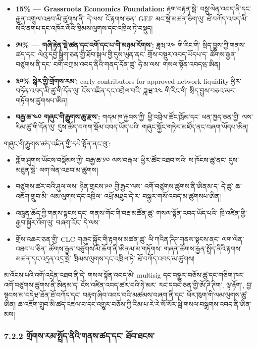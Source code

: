 \documentclass[11pt]{article}
\begin{document}
\begin{itemize}[leftmargin=*]
\item \textbf{15\% --- Grassroots Economics Foundation:} རྟག་བརྟན་སྦེ་ བསྡུ་ལེན་འབད་ནི་དང་ རྒྱུན་འགྲུལ་འཐབ་མི་ཚུགས་ནི་ དེ་ལས་ ངོ་རྟགས་ཅན་ GEF མང་སྡེ་མཚན་ཅིག་ལུ་ ཐོ་བཀོད་འབད་མི་ སའི་ནགཔ་དང་འཁོར་ལོའི་ཁྲིམས་ལུགས་དང་འཁྲིལ་ཏེ་བསྡུད།
\item \textbf{༡༥\% --- གཞི་རྟེན་སྡེ་ཚན་དང་འགོ་དང་པ་གི་མཉམ་རོགས་:} ཟླཝ་༢༤ གི་རིང་གི་ སྲིད་བྱུས་ཀྱི་གནས་ཚད་དང་ ལེའུ་དབྱེ་སྒྲིག་ཅན་གྱི་ཐོབ་སྐལ་གྱི་དུས་ཡུན་ནང་ གྲོས་བསྡུར་འབད་ཡོདཔ་ད་ ཚོགས་རྒྱན་བཙུགས་ནི་དང་ བགོ་བཀྲམ་འབད་ནིའི་གནད་དོན་ཚུ་ ཧེ་མ་ལས་ གསལ་སྟོན་འབདཝ་ཨིན།
\item \textbf{༣༠\%  སྒེར་གྱི་གྲོགས་རམ་:} early contributors for approved network liquidity ཕྱིར་བཏོན་འབད་མི་ཚུ་གི་དོན་ལུ་ ངོས་འཛིན་དང་འབྲེལ་བའི་ ཟླཝ་༢༤ གི་རིང་གི་ སྲིད་བྱུས་བཅའ་མར་གཏོགས་ཚུགསཔ་ཨིན།
\item \textbf{བརྒྱ་ཆ་༤༠  གཞུང་གི་རྒྱུགས་ཆུ་རྫས་:} གདམ་ཁ་རྐྱབས་ཀྱི་ ཕྱི་འབྲེལ་ཚོང་ཁྲོམ་དང་ ཕན་ཁྱད་ཅན་གྱི་ ལས་རིམ་ཚུ་གི་དོན་ལུ་ དུས་ཚོད་བཀག་སྡོམ་འབད་ཡོད་པའི་ གཞུང་སྐྱོང་གཏེར་མཛོད་ནང་བཞག་ཡོདཔ་ཨིན།
\end{itemize}
གཞུང་གི་རྒྱུགས་ཚད་འཛིན་གྱི་དཔེ་སྟོན་ནང་ལུ་:

\begin{itemize}[leftmargin=*]
\item གློག་ཤུགས་ཡོངས་བསྡོམས་ཀྱི་ བརྒྱ་ཆ་༡༠ ལས་བརྒལ་ ཕྱིར་ཚོང་འཐབ་སའི་ ས་ཁོངས་ཚུ་ནང་ དུས་མཐུན་སྦེ་ ལག་ལེན་འཐབ་མ་ཚུགས།
\item བཙུགས་ཚར་བའི་ཤུལ་ལས་ ཉིན་གྲངས་༩༠ གྱི་རྒྱབ་ལས་ འགོ་བཙུགས་ཚུགས་ནི་ཨིནམ་ད་ དེ་ཚུ་ ཆ་འཇོག་གྲུབ་མི་ ལམ་ལུགས་དང་འཁྲིལ་ འཕྲོ་མཐུད་དེ་ར་ བསྐྱར་གསོ་འབད་མ་ཚུགསཔ་ཨིན།
\item འཁྲུན་ཆོད་ཀྱི་གནས་སྟངས་དང་ གནས་གོང་གི་བརྡ་མཚོན་ཚུ་ གསལ་སྟོན་འབད་ཡོད་པའི་ ཁྲི་འཛིན་གྱི་རྒྱབ་སྐྱོར་འོག་ལུ་ བཞག་འོང་ དེ་ལས་
\item གྲོས་འཆར་ཅན་གྱི་ CLC གཞུང་སྐྱོང་གི་རྟགས་མཚན་ཚུ་ ལི་ཀའིན་ཌིཊ་གནས་སྟངས་ནང་ ལག་ལེན་འཐབ་པ་ཅིན་ ཚོགས་རྒྱན་བཙུགས་མི་ཆོག་ནི་ཨིནམ་མ་གཏོགས་ གཞན་ཚོགས་རྒྱན་སྤྲོད་ནིའི་རྟགས་མཚན་དང་འདྲན་འདྲ་སྦེ་ ཁྲིམས་ལུགས་དང་འཁྲིལ་ཏེ་ ཐོ་བཀོད་འབད་མ་ཚུགས།
\end{itemize}
མ་འོངས་པའི་འགོ་འདྲེན་འཐབ་ནི་དེ་ གསལ་སྟོན་འབད་མི་ multisig དང་བསྒྱུར་བཅོས་ཚུ་དང་གཅིག་ཁར་ འགོ་བཙུགས་ཚུགས་ནི་ཨིནམ་ད་ ངོས་འཛིན་འབད་ཚར་བའི་ཧེ་མར་ རང་དབང་ཅན་གྱི་ཨོ་ཌི་ཊིག་, ལྟ་རྟོག་, བྱ་སྟབས་མ་བདེཝ་ཐོན་ཐོ་བཀོད་དང་ བརྟག་ཞིབ་འབད་བའི་མཚམས་བཞག་ནི་དང་ ཕོར་ཁུག་གི་ལམ་ལུགས་ཚུ་ཨིན། ཆ་འཇོག་གྲུབ་མི་ཚད་འཇལ་བ་དང་འགྱུར་བཅོས་ཀྱི་རིམ་པ་རེ་རེ་སོ་སོར་སྦེ་གསལ་བསྒྲགས་འབད་ནི་ཨིན་མས།

\subsubsection*{7.2.2 གྲོགས་རམ་སྤྲོད་ནིའི་གནས་ཚད་དང་ ཐོབ་ཐངས་}
\end{document}
